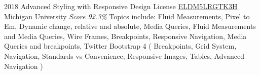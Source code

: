 \documentclass[11pt,a4paper]{moderncv}
\begin{document}
\cventry
    {2018}
    {Advanced Styling with Responsive Design}
    {License
        \href{https://www.coursera.org/account/accomplishments/records/ELDM5LRGTK3H}
        {ELDM5LRGTK3H}
    }
    {Michigan University}
    {\textit{Score 92.3\%}}
    {
        Topics include:                                                          %
            Fluid Measurements,                                                          %
            Pixel to Em,                                                          %
            Dynamic change,                                                          %
            relative and absolute,                                                          %
            Media Queries,                                                          %
            Fluid Measurements and Media Queries,                                                          %
            Wire Frames,                                                          %
            Breakpoints,                                                          %
            Responsive Navigation,                                                          %
            Media Queries and breakpoints,                                                          %
            Twitter Bootstrap 4 (                                                          %
                Breakpoints,                                                          %
                Grid System,                                                          %
                Navigation,                                                          %
                Standards vs Convenience,                                                          %
                Responsive Images,                                                          %
                Tables,                                                          %
                Advanced Navigation                                                          %
                )                                                          %
    }
\end{document}
